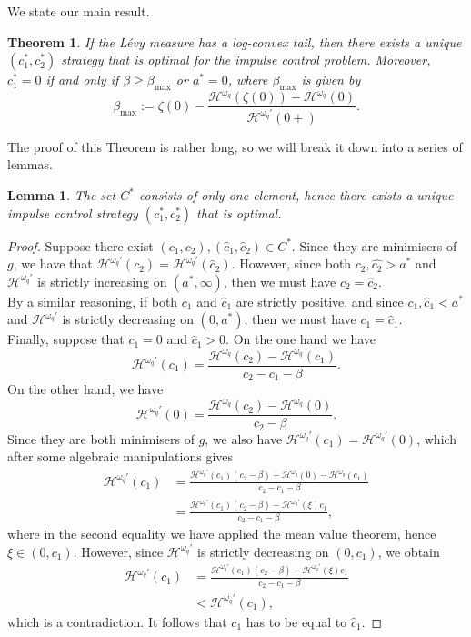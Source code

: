 \documentclass[11pt,reqno]{amsart}
\newtheorem{theorem}{Theorem}[section]
\newtheorem{lemma}{Lemma}[section]
\newcommand{\cH}{\mathcal{H}}
\newcommand{\homega}{\omega_q}
\renewcommand{\geq}{\geqslant}
\begin{document}
We state our main result.
\begin{theorem}\label{thm.unique}
	If the L\'evy measure has a log-convex tail, then there exists a unique $(c^\ast_1,c^\ast_2)$ strategy that is optimal for the impulse control problem. Moreover, $c_1^\ast = 0$ if and only if $\beta \geq \beta_{\max}$ or $a^\ast = 0$, where $\beta_{\max}$ is given by 
	\begin{equation}\label{eq:betamax}
		\beta_{\max}:= \zeta(0) - \frac{\cH^{\homega}(\zeta(0)) - \cH^{\homega}(0)}{\cH^{\homega\prime}(0+)}.
	\end{equation}
\end{theorem}
The proof of this Theorem is rather long, so we will break it down into a series of lemmas.
\begin{lemma}\label{lemma.unique} The set $C^\ast$ consists of only one element, hence there exists a unique impulse control strategy $(c_1^\ast,c_2^\ast)$ that is optimal.
\end{lemma}
\begin{proof}
	Suppose there exist $(c_1,c_2), (\hat{c}_1,\hat{c}_2) \in C^\ast$. Since they are minimisers of $g$, we have that $\cH^{\homega\prime}(c_2)= \cH^{\homega\prime}(\hat{c}_2)$. However, since both $c_2,\hat{c_2} > a^\ast$ and $\cH^{\homega\prime}$ is strictly increasing on $(a^\ast,\infty)$, then we must have $c_2 = \hat{c}_2$.\\
	By a similar reasoning, if both $c_1$ and $\hat{c}_1$ are strictly positive, and since $c_1,\hat{c}_1 < a^\ast$ and $\cH^{\homega\prime}$ is strictly decreasing on $(0,a^\ast)$, then we must have $c_1 = \hat{c}_1$.\\
	Finally, suppose that $c_1 = 0$ and $\hat{c}_1 > 0$. On the one hand we have
	\[
	\cH^{\homega\prime}(c_1) = \frac{\cH^{\homega}(c_2)-\cH^{\homega}(c_1)}{c_2-c_1-\beta}.
	\]
	On the other hand, we have
	\[
	\cH^{\homega\prime}(0) = \frac{\cH^{\homega}(c_2)-\cH^{\homega}(0)}{c_2-\beta}.
	\]
	Since they are both minimisers of $g$, we also have $ \cH^{\homega\prime}(c_1) = \cH^{\homega\prime}(0) $, which after some algebraic manipulations gives
	\begin{align*}
	\cH^{\homega\prime}(c_1) &= \frac{\cH^{\homega\prime}(c_1)(c_2-\beta) + \cH^{\homega}(0) - \cH^{\homega}(c_1)}{c_2-c_1-\beta}\\
	&= \frac{\cH^{\homega\prime}(c_1)(c_2-\beta) - \cH^{\homega\prime}(\xi)c_1}{c_2-c_1-\beta},
	\end{align*}
	where in the second equality we have applied the mean value theorem, hence $\xi \in (0,c_1)$. However, since $\cH^{\homega\prime}$ is strictly decreasing on $(0,c_1)$, we obtain
	\begin{align*}
	\cH^{\homega\prime}(c_1) &= \frac{\cH^{\homega\prime}(c_1)(c_2-\beta) - \cH^{\homega\prime}(\xi)c_1}{c_2-c_1-\beta}\\
	&< \cH^{\homega\prime}(c_1),
	\end{align*}
	which is a contradiction. It follows that $c_1$ has to be equal to $\hat{c}_1$.
\end{proof}
\end{document}
